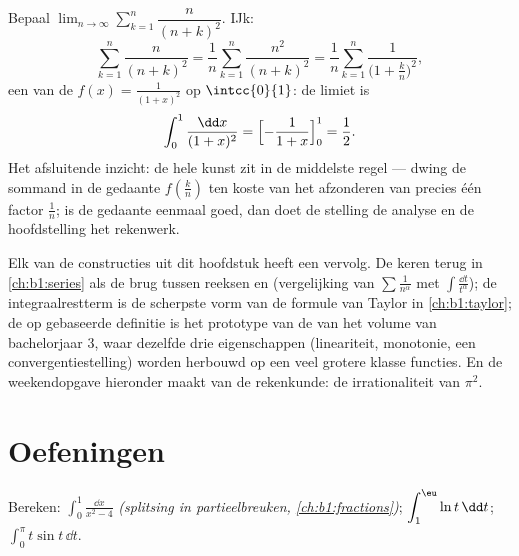\begin{example}\label{ex:b1:integration:riemann2}
Bepaal $\lim_{n\to\infty} \sum_{k=1}^{n} \dfrac{n}{(n+k)^2}$.
IJk:
\[
\sum_{k=1}^{n} \frac{n}{(n+k)^2}
= \frac{1}{n}\sum_{k=1}^{n} \frac{n^2}{(n+k)^2}
= \frac1n \sum_{k=1}^{n} \frac{1}{\bigl(1 + \frac kn\bigr)^2} ,
\]
een  van de  $f(x) = \frac{1}{(1+x)^2}$ op
$\intcc{0}{1}$: de limiet is
\[
\int_0^1 \frac{\dd x}{(1 + x)^2}
= \Bigl[-\frac{1}{1+x}\Bigr]_0^1 = \frac12 .
\]
Het afsluitende inzicht: de hele kunst zit in de middelste regel
--- dwing de sommand in de gedaante $f(\frac kn)$ ten koste van
het afzonderen van precies één factor $\frac1n$; is de gedaante
eenmaal goed, dan doet de stelling de analyse en de hoofdstelling
het rekenwerk.
\end{example}

\begin{remark}
Elk van de constructies uit dit hoofdstuk heeft een vervolg. De
 keren terug in \cref{ch:b1:series} als de brug
tussen reeksen en  (vergelijking van $\sum
\frac{1}{n^\alpha}$ met $\int \frac{\dd t}{t^\alpha}$); de
integraalrestterm is de scherpste vorm van de formule van Taylor
in \cref{ch:b1:taylor}; de op  gebaseerde definitie is het
prototype van de  van het volume van
bachelorjaar 3, waar dezelfde drie eigenschappen (lineariteit,
monotonie, een convergentiestelling) worden herbouwd op een veel
grotere klasse functies. En de weekendopgave hieronder maakt van
de  rekenkunde: de irrationaliteit van
$\pi^2$.
\end{remark}

\section{Oefeningen}

\begin{exercise}[$\star$]\label{exo:b1:integration:1}
Bereken: $\displaystyle\int_0^1 \frac{\dd x}{x^2 - 4}$
\emph{(splitsing in partieelbreuken, \cref{ch:b1:fractions})};
$\displaystyle\int_1^{\eu} \ln t \,\dd t$;
$\displaystyle\int_0^{\pi} t \sin t\, \dd t$.
\end{exercise}

